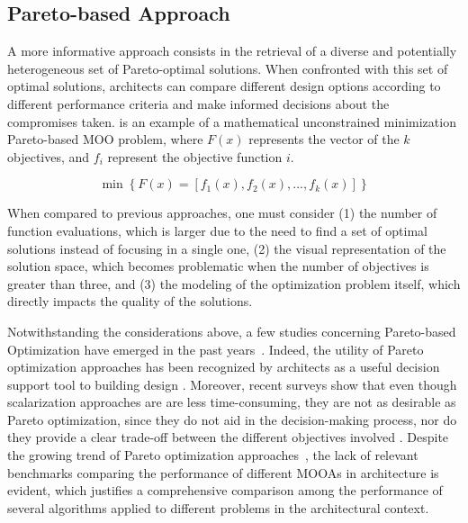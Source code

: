 \subsection{Pareto-based Approach}

	A more informative approach consists in the retrieval of a diverse and potentially heterogeneous set of Pareto-optimal solutions. When confronted with this set of optimal solutions, architects can compare different design options according to different performance criteria and make informed decisions about the compromises taken.  is an example of a mathematical unconstrained minimization Pareto-based \ac{MOO} problem, where $F(x)$ represents the vector of the $k$ objectives, and $f_i$ represent the objective function $i$.
		
    \begin{equation} \label{eq:pareto-based}
    	\min \left\lbrace F(x) = \left[f_1(x), f_2(x), ..., f_k(x)\right] \right\rbrace
    \end{equation}
    
	When compared to previous approaches, one must consider (1) the number of function evaluations, which is larger due to the need to find a set of optimal solutions instead of focusing in a single one, (2) the visual representation of the solution space, which becomes problematic when the number of objectives is
greater than three, and (3) the modeling of the optimization problem itself, which directly impacts the quality of the solutions. 

	Notwithstanding the considerations above, a few studies concerning Pareto-based Optimization have emerged in the past years~\cite{Evins2013,Hamdy2016}. Indeed, the utility of Pareto optimization approaches has been recognized by architects as a useful decision support tool to building design \cite{Cichocka2017SURVEY}. Moreover, recent surveys show that even though scalarization approaches are are less time-consuming, they are not as desirable as Pareto optimization, since they do not aid in the decision-making process, nor do they provide a clear trade-off between the different objectives involved \cite{Attia2013, Cichocka2017SURVEY}.
Despite the growing trend of Pareto optimization approaches~\cite{Evins2013}, the lack of relevant benchmarks comparing the performance of different \acp{MOOA} in architecture is evident, which justifies a comprehensive comparison among the performance of several algorithms applied to different problems in the architectural context.

